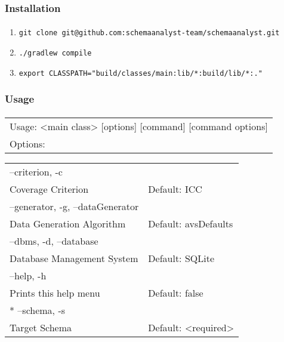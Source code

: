 \begin{frame}
	 \frametitle{Installation}
        \framesubtitle{\mbox{}}
        \centering
	\begin{enumerate}
		\item \texttt{git clone git@github.com:schemaanalyst-team/schemaanalyst.git}
		\item \texttt{./gradlew compile}
		\item \texttt{export CLASSPATH="build/classes/main:lib/*:build/lib/*:."}
	\end{enumerate}
 \end{frame}

 \begin{frame}%
        \frametitle{Usage}
        \framesubtitle{\mbox{}}
        \centering
	\begin{tabular}{l}
		\hspace{-1em} Usage: <main class> [options] [command] [command options] \\
  Options: \\
  \end{tabular}
  \begin{tabular}{ll}
   \hspace{1em} --criterion, -c\\
     \hspace{2em}  Coverage Criterion & Default: ICC\\
   \hspace{1em} --generator, -g, --dataGenerator\\
     \hspace{2em}  Data Generation Algorithm & Default: avsDefaults\\
  \hspace{1em}  --dbms, -d, --database\\
  \hspace{2em}    Database Management System & Default: SQLite\\
   \hspace{1em} --help, -h\\
   \hspace{2em}    Prints this help menu & Default: false\\
\hspace{1em}  * --schema, -s\\
\hspace{2em}     Target Schema & Default: <required>
	\end{tabular}
\end{frame}
